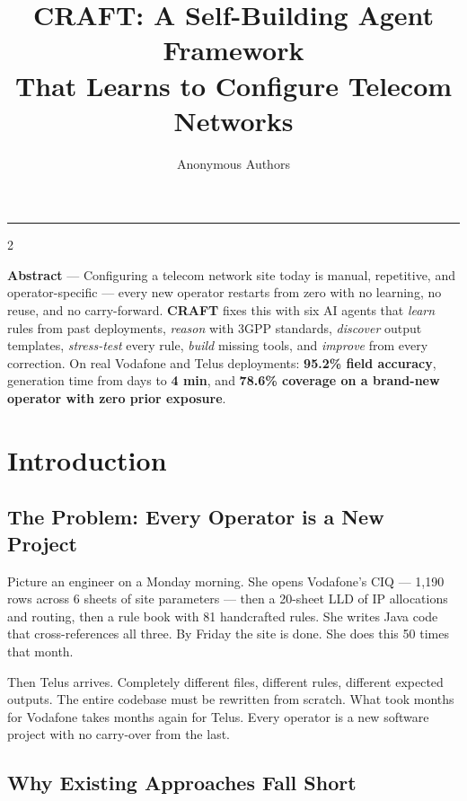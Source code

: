 \documentclass[10.5pt]{article}
\title{\textbf{\large CRAFT: A Self-Building Agent Framework\\[1pt]
That Learns to Configure Telecom Networks}}
\author{Anonymous Authors}
\date{}
\begin{document}
\maketitle

\vspace{2pt}\hrule\vspace{2pt}

\begin{multicols}{2}

\noindent\textbf{Abstract} --- Configuring a telecom network site today is manual, repetitive, and
operator-specific --- every new operator restarts from zero with no learning, no reuse, and no
carry-forward. \textbf{CRAFT} fixes this with six AI agents that \emph{learn} rules from past
deployments, \emph{reason} with 3GPP standards, \emph{discover} output templates, \emph{stress-test}
every rule, \emph{build} missing tools, and \emph{improve} from every correction. On real Vodafone
and Telus deployments: \textbf{95.2\% field accuracy}, generation time from days to \textbf{4 min},
and \textbf{78.6\% coverage on a brand-new operator with zero prior exposure}.

\section{Introduction}

\subsection*{The Problem: Every Operator is a New Project}

Picture an engineer on a Monday morning. She opens Vodafone's CIQ --- 1,190 rows across 6 sheets
of site parameters --- then a 20-sheet LLD of IP allocations and routing, then a rule book with
81 handcrafted rules. She writes Java code that cross-references all three. By Friday the site is
done. She does this 50 times that month.

Then Telus arrives. Completely different files, different rules, different expected outputs. The
entire codebase must be rewritten from scratch. What took months for Vodafone takes months again
for Telus. Every operator is a new software project with no carry-over from the last.

\subsection*{Why Existing Approaches Fall Short}


\end{multicols}
\end{document}
